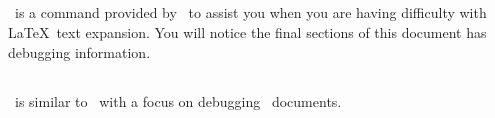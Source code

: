 \subsection{\adTlcDebug}
\adTlcDebug\ is a command provided by \adTlcArticle\ to assist you when you are
having difficulty with \LaTeX\ text expansion.  You will notice the final
sections of this document has debugging information.

\subsection{\adAutoDocDebug}
\adAutoDocDebug\ is similar to \adTlcDebug\ with a focus on debugging \adAutoDoc\
documents.

